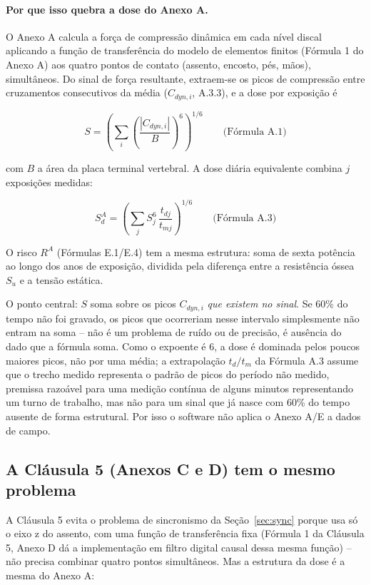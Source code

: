\documentclass[11pt,a4paper]{article}
\begin{document}
\paragraph{Por que isso quebra a dose do Anexo A.} O Anexo A calcula a
força de compressão dinâmica em cada nível discal aplicando a função de
transferência do modelo de elementos finitos (Fórmula 1 do Anexo A) aos
quatro pontos de contato (assento, encosto, pés, mãos), simultâneos. Do
sinal de força resultante, extraem-se os picos de compressão entre
cruzamentos consecutivos da média ($C_{dyn,i}$, A.3.3), e a dose por
exposição é

\begin{equation}
S = \left(\sum_i \left(\frac{|C_{dyn,i}|}{B}\right)^{6}\right)^{1/6}
\qquad \text{(Fórmula A.1)}
\end{equation}

com $B$ a área da placa terminal vertebral. A dose diária equivalente
combina $j$ exposições medidas:

\begin{equation}
S_d^A = \left(\sum_j S_j^{6}\,\frac{t_{dj}}{t_{mj}}\right)^{1/6}
\qquad \text{(Fórmula A.3)}
\end{equation}

O risco $R^A$ (Fórmulas E.1/E.4) tem a mesma estrutura: soma de sexta
potência ao longo dos anos de exposição, dividida pela diferença entre a
resistência óssea $S_u$ e a tensão estática.

O ponto central: $S$ soma sobre os picos $C_{dyn,i}$ \emph{que existem no
sinal}. Se 60\% do tempo não foi gravado, os picos que ocorreriam nesse
intervalo simplesmente não entram na soma -- não é um problema de ruído ou
de precisão, é ausência do dado que a fórmula soma. Como o expoente é 6, a
dose é dominada pelos poucos maiores picos, não por uma média; a
extrapolação $t_d/t_m$ da Fórmula A.3 assume que o trecho medido
representa o padrão de picos do período não medido, premissa razoável
para uma medição contínua de alguns minutos representando um turno de
trabalho, mas não para um sinal que já nasce com 60\% do tempo ausente de
forma estrutural. Por isso o software não aplica o Anexo A/E a dados de
campo.

\subsection{A Cláusula 5 (Anexos C e D) tem o mesmo problema}
\label{sec:clause5}

A Cláusula 5 evita o problema de sincronismo da
Seção~\ref{sec:sync} porque usa só o eixo z do assento, com uma função de
transferência fixa (Fórmula 1 da Cláusula 5, Anexo D dá a implementação em
filtro digital causal dessa mesma função) -- não precisa combinar quatro
pontos simultâneos. Mas a estrutura da dose é a mesma do Anexo A:
\end{document}
